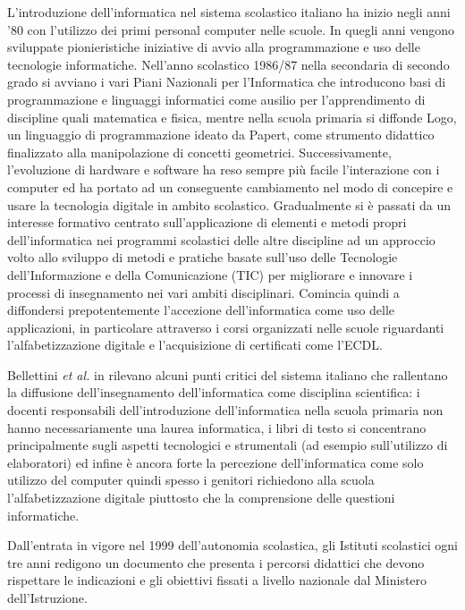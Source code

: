 \documentclass[12pt]{report}
\begin{document}
L'introduzione dell'informatica nel sistema scolastico italiano ha inizio negli anni '80 con l’utilizzo dei primi personal computer nelle scuole. In quegli anni vengono sviluppate pionieristiche iniziative di avvio alla programmazione e uso delle tecnologie informatiche. Nell'anno scolastico 1986/87 nella secondaria di secondo grado si avviano i vari Piani Nazionali per l’Informatica che introducono basi di programmazione e linguaggi informatici come ausilio per l'apprendimento di discipline quali matematica e fisica, mentre nella scuola primaria si diffonde Logo, un linguaggio di programmazione ideato da Papert, come strumento didattico finalizzato alla manipolazione di concetti geometrici.
Successivamente, l'evoluzione di hardware e software ha reso sempre più facile l'interazione con i computer ed ha portato ad un conseguente cambiamento nel modo di concepire e usare la tecnologia digitale in ambito scolastico. Gradualmente si è passati da un interesse formativo centrato sull'applicazione di elementi e metodi propri dell'informatica nei programmi scolastici delle altre discipline ad un approccio volto allo sviluppo di metodi e pratiche basate sull'uso delle Tecnologie dell'Informazione e della Comunicazione (TIC) per migliorare e innovare i processi di insegnamento nei vari ambiti disciplinari. Comincia quindi a diffondersi prepotentemente l'accezione dell'informatica come uso delle applicazioni, in particolare attraverso i corsi organizzati nelle scuole riguardanti l'alfabetizzazione digitale e l'acquisizione di certificati come l'ECDL.


Bellettini \textit{et al.} in \cite{BellettiniTOCE2014} rilevano alcuni punti critici del sistema italiano che rallentano la diffusione dell'insegnamento dell'informatica come disciplina scientifica: i docenti responsabili dell'introduzione dell'informatica nella scuola primaria non hanno necessariamente una laurea informatica, i libri di testo si concentrano principalmente sugli aspetti tecnologici e strumentali (ad esempio sull'utilizzo di elaboratori) ed infine è ancora forte la percezione dell'informatica come solo utilizzo del computer quindi spesso i genitori richiedono alla scuola l'alfabetizzazione digitale piuttosto che la comprensione delle questioni informatiche.

Dall'entrata in vigore nel 1999 dell'autonomia scolastica, gli Istituti scolastici ogni tre anni redigono un documento che presenta i percorsi didattici che devono rispettare le indicazioni e gli obiettivi fissati a livello nazionale dal Ministero dell'Istruzione. 
\end{document}
